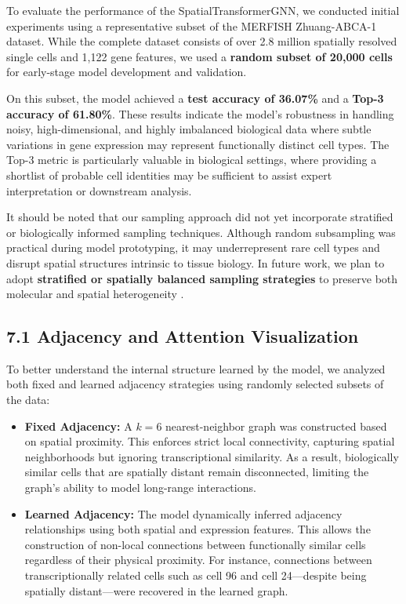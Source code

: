 \documentclass[unnumsec,webpdf,contemporary,medium]{oup-authoring-template}
\begin{document}
To evaluate the performance of the SpatialTransformerGNN, we conducted initial experiments using a representative subset of the MERFISH Zhuang-ABCA-1 dataset. While the complete dataset consists of over 2.8 million spatially resolved single cells and 1,122 gene features, we used a \textbf{random subset of 20,000 cells} for early-stage model development and validation.

On this subset, the model achieved a \textbf{test accuracy of 36.07\%} and a \textbf{Top-3 accuracy of 61.80\%}. These results indicate the model’s robustness in handling noisy, high-dimensional, and highly imbalanced biological data where subtle variations in gene expression may represent functionally distinct cell types. The Top-3 metric is particularly valuable in biological settings, where providing a shortlist of probable cell identities may be sufficient to assist expert interpretation or downstream analysis.

It should be noted that our sampling approach did not yet incorporate stratified or biologically informed sampling techniques. Although random subsampling was practical during model prototyping, it may underrepresent rare cell types and disrupt spatial structures intrinsic to tissue biology. In future work, we plan to adopt \textbf{stratified or spatially balanced sampling strategies} to preserve both molecular and spatial heterogeneity \cite{luecken2022benchmarking, stein2022singlecell}.

\subsection*{7.1 Adjacency and Attention Visualization}

To better understand the internal structure learned by the model, we analyzed both fixed and learned adjacency strategies using randomly selected subsets of the data:
\begin{itemize}
    \item \textbf{Fixed Adjacency:} A $k=6$ nearest-neighbor graph was constructed based on spatial proximity. This enforces strict local connectivity, capturing spatial neighborhoods but ignoring transcriptional similarity. As a result, biologically similar cells that are spatially distant remain disconnected, limiting the graph's ability to model long-range interactions.
    
    \item \textbf{Learned Adjacency:} The model dynamically inferred adjacency relationships using both spatial and expression features. This allows the construction of non-local connections between functionally similar cells regardless of their physical proximity. For instance, connections between transcriptionally related cells such as cell 96 and cell 24—despite being spatially distant—were recovered in the learned graph.
\end{itemize}
\end{document}
